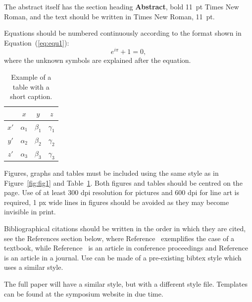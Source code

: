 \documentclass{bmd2019a}
\begin{document}
The abstract itself has the section heading \textbf{Abstract}, bold 11~pt
Times New Roman, and the text should be written in Times New Roman, 11~pt.

Equations should be numbered continuously according to the format
shown in Equation~(\ref{eq:equ1}):
\begin{equation} \label{eq:equ1}
e^{i\pi} + 1 = 0,
\end{equation}
where the unknown symbols are explained after the equation.

\begin{table}[h!]
\begin{center}
\caption{Example of a table with a short caption.} \label{tab:tab1}
\begin{tabular}{|c|ccc|}
\hline
    &  $x$  &  $y$  &  $z$ \\
\hline
$x'$  &  $\alpha_1$ & $\beta_1$ & $\gamma_1$ \\
$y'$  &  $\alpha_2$ & $\beta_2$ & $\gamma_2$ \\
$z'$  &  $\alpha_3$ & $\beta_3$ & $\gamma_3$ \\
\hline
\end{tabular}
\end{center}
\end{table}


Figures, graphs
and tables must be included using the same style as in Figure~\ref{fig:fig1}
and Table~\ref{tab:tab1}. Both figures and tables should be centred on the page. Use of at least 300 dpi resolution for pictures and 600 dpi for line art is required, 1 px wide lines in figures should be avoided as they may become invisible in print.

Bibliographical citations should be written in the
order in which they are cited, see the References section below, where
Reference~\cite{Pac02} exemplifies the case of a textbook, while
Reference~\cite{Ber07} is an article in conference proceedings and
Reference~\cite{Sha71} is an article in a journal. Use can be made of a
pre-existing bibtex style which uses a similar style.


The full paper will have a similar style, but with a different style file. Templates can be found at the symposium website in due time.
\end{document}

